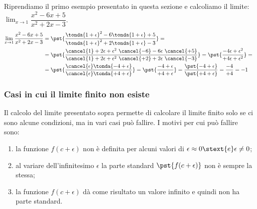 \begin{esempio}
Riprendiamo il primo esempio presentato in questa sezione e calcoliamo il 
limite: \(\displaystyle \lim_{x \to 1}\dfrac{x^2-6x+5}{x^2+2x-3}\).
\begin{align*}
\lim_{x \to 1}\dfrac{x^2-6x+5}{x^2+2x-3} &=
\pst{\dfrac{\tonda{1+\epsilon}^2-6\tonda{1+\epsilon}+5}
           {\tonda{1+\epsilon}^2+2\tonda{1+\epsilon}-3}} = \\
&=\pst{\dfrac{\cancel{1}+2\epsilon+\epsilon^2~
              \cancel{-6}-6\epsilon~\cancel{+5}}
           {\cancel{1}+2\epsilon+\epsilon^2~
            \cancel{+2}+2\epsilon~\cancel{-3}}} =
\pst{\dfrac{-4\epsilon+\epsilon^2}
           {+4\epsilon+\epsilon^2}} = \\
&=\pst{\dfrac{\cancel{\epsilon} \tonda{-4+\epsilon}}
             {\cancel{\epsilon} \tonda{+4+\epsilon}}} =
\pst{\dfrac{-4+\epsilon}{+4+\epsilon}} =
\dfrac{\pst{-4+\epsilon}}{\pst{+4+\epsilon}} =
\dfrac{-4}{+4} = -1
\end{align*}


\end{esempio}


\subsubsection{Casi in cui il limite finito non esiste}
\label{subsubsec:cont_limiti_nonesiste}

Il calcolo del limite presentato sopra permette di calcolare il limite 
finito solo se ci sono alcune condizioni, ma in vari casi può fallire. 
I motivi per cui può fallire sono:
\begin{enumerate} [nosep]
\item la funzione \(f(c+\epsilon)\) non è definita per alcuni valori di 
\(\epsilon \approx 0 \stext{e} \epsilon \neq 0\); 
\item al variare dell'infinitesimo \(\epsilon\) la parte standard 
\(\pst{f(c+\epsilon)}\) non è sempre la stessa;
\item la funzione \(f(c+\epsilon)\) dà come risultato un valore infinito e 
quindi non ha parte standard. 
\end{enumerate}

